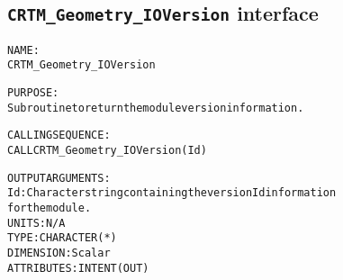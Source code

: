 \subsection{\texttt{CRTM\_Geometry\_IOVersion} interface}
  \label{sec:CRTM_Geometry_IOVersion_interface}
  \begin{alltt}
 
  NAME:
        CRTM_Geometry_IOVersion
 
  PURPOSE:
        Subroutine to return the module version information.
 
  CALLING SEQUENCE:
        CALL CRTM_Geometry_IOVersion( Id )
 
  OUTPUT ARGUMENTS:
        Id:            Character string containing the version Id information
                       for the module.
                       UNITS:      N/A
                       TYPE:       CHARACTER(*)
                       DIMENSION:  Scalar
                       ATTRIBUTES: INTENT(OUT)
 
  \end{alltt}
